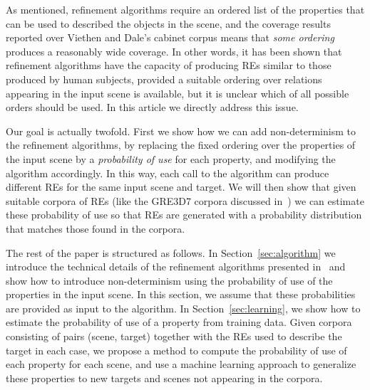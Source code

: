 As mentioned, refinement algorithms require an 
ordered list of the properties that can be used to described the objects in the scene, and the coverage results reported over Viethen and 
Dale's cabinet corpus means that \emph{some ordering} produces a reasonably wide coverage.  In other words, it has been shown that refinement algorithms have the capacity of producing REs similar to those produced by human subjects, provided a suitable ordering over relations appearing 
in the input scene is available, but it is unclear which of all possible orders should be used.  In this article we directly address this issue.  

Our goal is actually twofold. First we show how we can add non-determinism to the refinement algorithms, by replacing the fixed ordering 
over the properties of the input scene by a \emph{probability of use} for each property, and modifying the algorithm accordingly.  
In this way, each call to the algorithm can produce different REs for the same input scene and target.  We will then show that given suitable corpora of REs (like the GRE3D7 corpora discussed in~\cite{viet:gene11}) we can estimate these probability of use so that REs are generated with a probability distribution that matches those found in the corpora.  

The rest of the paper is structured as follows. In Section~\ref{sec:algorithm} we introduce the technical details of the 
refinement algorithms presented in~\cite{arec2:2008:Areces,arec:usin11} and show how to introduce non-determinism using 
the probability of use of the properties in the input scene. In this section, we assume that these probabilities are provided as 
input to the algorithm. In Section~\ref{sec:learning}, we show how to estimate the 
probability of use of a property from training data. Given corpora consisting of pairs (scene, target) together with the REs used to 
describe the target in each case, we propose a method to compute the probability of use of each property for each scene, and use a machine learning approach to generalize these properties to new targets and scenes not appearing in the corpora. 

